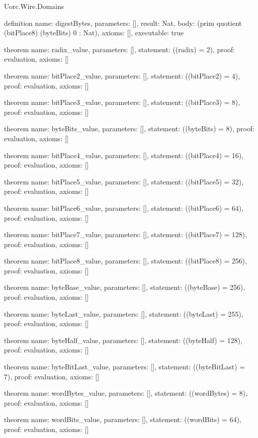 \begin{lexlean}{Uorc.Wire.Domains}
\begin{semanticmodule}
definition{
  name: digestBytes,
  parameters: [],
  result: Nat,
  body: (prim quotient (bitPlace8) (byteBits) 0 : Nat),
  axioms: [],
  executable: true
}

theorem{
  name: radix_value,
  parameters: [],
  statement: ((radix) = 2),
  proof: evaluation{},
  axioms: []
}

theorem{
  name: bitPlace2_value,
  parameters: [],
  statement: ((bitPlace2) = 4),
  proof: evaluation{},
  axioms: []
}

theorem{
  name: bitPlace3_value,
  parameters: [],
  statement: ((bitPlace3) = 8),
  proof: evaluation{},
  axioms: []
}

theorem{
  name: byteBits_value,
  parameters: [],
  statement: ((byteBits) = 8),
  proof: evaluation{},
  axioms: []
}

theorem{
  name: bitPlace4_value,
  parameters: [],
  statement: ((bitPlace4) = 16),
  proof: evaluation{},
  axioms: []
}

theorem{
  name: bitPlace5_value,
  parameters: [],
  statement: ((bitPlace5) = 32),
  proof: evaluation{},
  axioms: []
}

theorem{
  name: bitPlace6_value,
  parameters: [],
  statement: ((bitPlace6) = 64),
  proof: evaluation{},
  axioms: []
}

theorem{
  name: bitPlace7_value,
  parameters: [],
  statement: ((bitPlace7) = 128),
  proof: evaluation{},
  axioms: []
}

theorem{
  name: bitPlace8_value,
  parameters: [],
  statement: ((bitPlace8) = 256),
  proof: evaluation{},
  axioms: []
}

theorem{
  name: byteBase_value,
  parameters: [],
  statement: ((byteBase) = 256),
  proof: evaluation{},
  axioms: []
}

theorem{
  name: byteLast_value,
  parameters: [],
  statement: ((byteLast) = 255),
  proof: evaluation{},
  axioms: []
}

theorem{
  name: byteHalf_value,
  parameters: [],
  statement: ((byteHalf) = 128),
  proof: evaluation{},
  axioms: []
}

theorem{
  name: byteBitLast_value,
  parameters: [],
  statement: ((byteBitLast) = 7),
  proof: evaluation{},
  axioms: []
}

theorem{
  name: wordBytes_value,
  parameters: [],
  statement: ((wordBytes) = 8),
  proof: evaluation{},
  axioms: []
}

theorem{
  name: wordBits_value,
  parameters: [],
  statement: ((wordBits) = 64),
  proof: evaluation{},
  axioms: []
}


\end{semanticmodule}
\end{lexlean}

